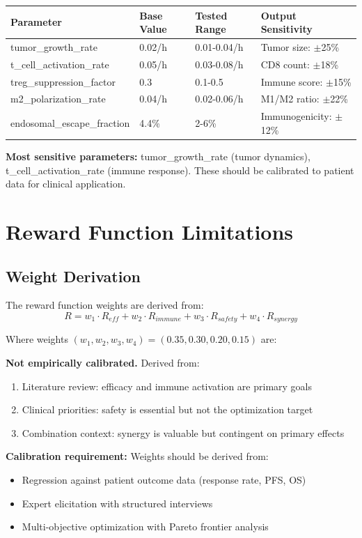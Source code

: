 \documentclass{article}
\begin{document}
\begin{longtable}{llll}
\toprule
Parameter & Base Value & Tested Range & Output Sensitivity \\
\midrule
tumor\_growth\_rate & 0.02/h & 0.01-0.04/h & Tumor size: $\pm$25\% \\
t\_cell\_activation\_rate & 0.05/h & 0.03-0.08/h & CD8 count: $\pm$18\% \\
treg\_suppression\_factor & 0.3 & 0.1-0.5 & Immune score: $\pm$15\% \\
m2\_polarization\_rate & 0.04/h & 0.02-0.06/h & M1/M2 ratio: $\pm$22\% \\
endosomal\_escape\_fraction & 4.4\% & 2-6\% & Immunogenicity: $\pm$12\% \\
\bottomrule
\end{longtable}

\textbf{Most sensitive parameters:} tumor\_growth\_rate (tumor dynamics), t\_cell\_activation\_rate (immune response). These should be calibrated to patient data for clinical application.

\section{Reward Function Limitations}

\subsection{Weight Derivation}

The reward function weights are derived from:
\begin{equation}
R = w_1 \cdot R_{eff} + w_2 \cdot R_{immune} + w_3 \cdot R_{safety} + w_4 \cdot R_{synergy}
\end{equation}

Where weights $(w_1, w_2, w_3, w_4) = (0.35, 0.30, 0.20, 0.15)$ are:

\textbf{Not empirically calibrated.} Derived from:
\begin{enumerate}
\item Literature review: efficacy and immune activation are primary goals
\item Clinical priorities: safety is essential but not the optimization target
\item Combination context: synergy is valuable but contingent on primary effects
\end{enumerate}

\textbf{Calibration requirement:} Weights should be derived from:
\begin{itemize}
\item Regression against patient outcome data (response rate, PFS, OS)
\item Expert elicitation with structured interviews
\item Multi-objective optimization with Pareto frontier analysis
\end{itemize}
\end{document}
